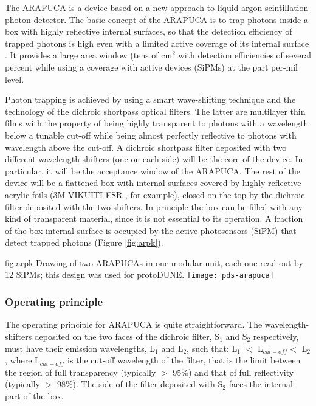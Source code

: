 
The ARAPUCA is a device based on a new approach to liquid argon scintillation photon detector.  The basic concept of the ARAPUCA is to trap photons inside a box with highly reflective internal surfaces, so that the detection efficiency of trapped photons is high even with a limited active coverage of its internal surface \cite{arapuca_jinst}. It provides a large area window (tens of cm$^2$ with detection efficiencies of several percent while using a coverage with active devices (SiPMs) at the part per-mil level.

Photon trapping is achieved by using a smart wave-shifting technique and the technology of the dichroic shortpass optical filters. The latter are multilayer thin films with the property of being highly transparent to photons with a wavelength below a tunable cut-off while being almost perfectly reflective to photons with wavelength above the cut-off. A dichroic shortpass filter deposited with two different wavelength shifters (one on each side) will be the core of the device. In particular, it will be the acceptance window of the ARAPUCA. The rest of the device will be a flattened box with internal surfaces covered by highly reflective acrylic foils (3M-VIKUITI ESR \cite{VIKUITI}, for example), closed on the top by the dichroic filter deposited with the two shifters. In principle the box can be filled with any kind of transparent material, since it is not essential to its operation. A fraction of the box internal surface is occupied by the active photosensors (SiPM) that detect trapped photons (Figure \ref{fig:arpk}).

\begin{dunefigure}{fig:arpk}
{Drawing of two ARAPUCAs in one modular unit, each one read-out by 12 SiPMs; this design was used for protoDUNE.} 
\texttt{[image: pds-arapuca]}
\end{dunefigure}


\subsubsection{Operating principle}
The operating principle for ARAPUCA is quite straightforward. The wavelength-shifters deposited on the two faces of the dichroic filter, S$_1$ and S$_2$ respectively, must have their emission wavelengths, L$_1$ and L$_2$, such that: L$_1$ $<$ L$_{cut-off}$$ <$ L$_2$, where L$_{cut-off}$ is the cut-off wavelength of the filter, that is the limit between the region of full transparency (typically $>$ 95\%) and that of full reflectivity (typically $>$ 98\%). The side of the filter deposited with S$_2$ faces the internal part of the box.

